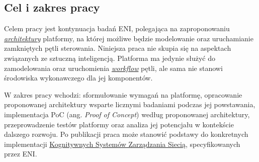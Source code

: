\subsection{Cel i zakres pracy}

Celem pracy jest kontynuacja badań ENI, polegająca na zaproponowaniu \hyperlink{def:architektura}{\textit{architektury}} platformy, na której możliwe będzie modelowanie oraz uruchamianie zamkniętych pętli sterowania. Niniejsza praca nie skupia się na aspektach związanych ze sztuczną inteligencją. Platforma ma jedynie służyć do zamodelowania oraz uruchomienia \hyperlink{def:workflow}{\textit{workflow}} pętli, ale sama nie stanowi środowiska wykonawczego dla jej komponentów. 

W zakres pracy wchodzi: sformułowanie wymagań na platformę, opracowanie proponowanej architektury wsparte licznymi badaniami podczas jej powstawania, implementacja PoC (ang. \textit{Proof of Concept}) według proponowanej architektury, przeprowadzenie testów platformy oraz analiza jej potencjału w kontekście dalszego rozwoju. Po publikacji praca może stanowić podstawy do konkretnych implementacji \hyperlink{def:kognitywny-system-zarzadzania-siecia}{Kognitywnych Systemów Zarządzania Siecią}, specyfikowanych przez ENI. 